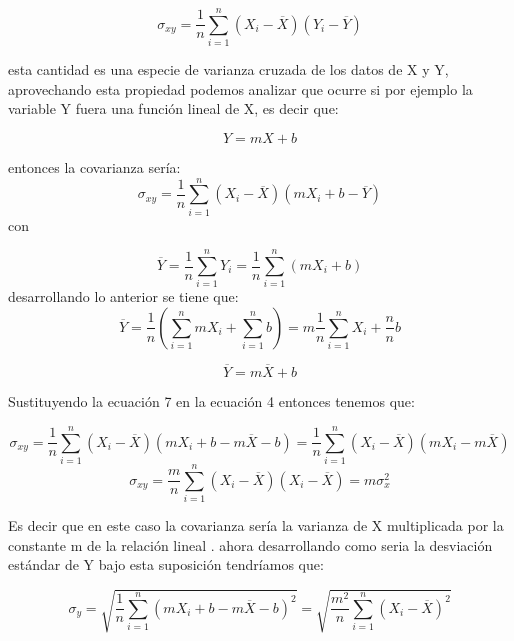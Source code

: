 \documentclass[12pt,letterpaper]{report}
\begin{document}
\begin{equation}
\sigma_{xy}=\frac{1}{n}\sum_{i=1}^{n} (X_{i}- \overline{X})(Y_{i}- \overline{Y})
\end{equation}

esta cantidad es una especie de varianza cruzada de los datos de X y Y, aprovechando esta propiedad podemos analizar que ocurre si por ejemplo la variable Y fuera una función lineal de X, es decir que:

\begin{equation}
Y= mX+b
\end{equation}

 entonces la covarianza sería:
\begin{equation}
\sigma_{xy}=\frac{1}{n}\sum_{i=1}^{n} (X_{i}- \overline{X})(mX_{i} +b - \overline{Y})
\end{equation}
con 

\begin{equation}
\overline{Y} = \frac{1}{n}\sum_{i=1}^{n} Y_{i}=\frac{1}{n}\sum_{i=1}^{n} (mX_{i}+b) 
\end{equation}
 desarrollando lo anterior se tiene que:
 \begin{equation}
\overline{Y} = \frac{1}{n} (\sum_{i=1}^{n} mX_{i} +\sum_{i=1}^{n} b) = m \frac{1}{n}\sum_{i=1}^{n} X_{i} + \frac{n}{n}b
\end{equation}

\begin{equation}
\overline{Y} = m\overline{X} +b
\end{equation}

Sustituyendo la ecuación 7 en la ecuación 4 entonces tenemos que:


\begin{equation}
\sigma_{xy}=\frac{1}{n}\sum_{i=1}^{n} (X_{i}- \overline{X})(mX_{i} +b - m\overline{X} -b)= \frac{1}{n}\sum_{i=1}^{n} (X_{i}- \overline{X})(mX_{i}  - m\overline{X} )
\end{equation}
\begin{equation}
\sigma_{xy} =\frac{m}{n}\sum_{i=1}^{n} (X_{i}- \overline{X})(X_{i}  - \overline{X} ) = m \sigma_{x}^{2}
\end{equation}

Es decir que en este caso la covarianza sería la varianza de X multiplicada por la constante m de la relación lineal . ahora desarrollando como seria la desviación estándar de Y bajo esta suposición tendríamos que:

\begin{equation}
\sigma_{y} = \sqrt{\frac{1}{n}\sum_{i=1}^{n}(mX_{i}+b - m\overline{X}-b)^{2}}= \sqrt{\frac{m^{2}}{n}\sum_{i=1}^{n}(X_{i} - \overline{X})^{2}}
\end{equation}
\end{document}
